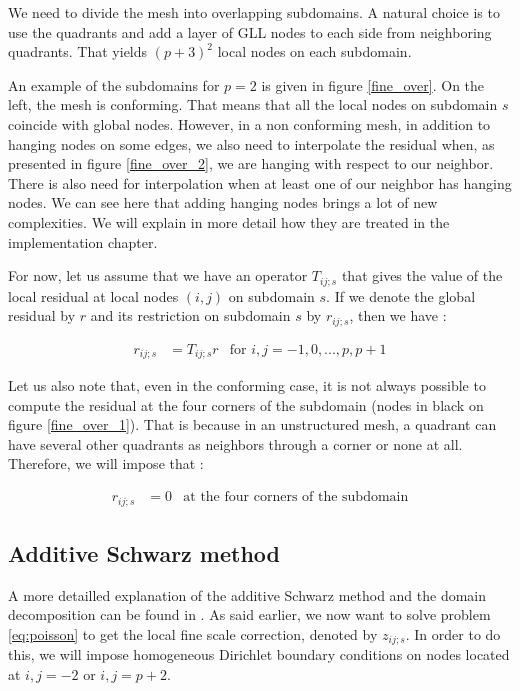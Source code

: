 We need to divide the mesh into overlapping subdomains. A natural choice is to use the quadrants and add a layer of GLL nodes to each side from neighboring quadrants. That yields $(p+3)^2$ local nodes on each subdomain. 

An example of the subdomains for $p=2$ is given in figure \ref{fine_over}. On the left, the mesh is conforming. That means that all the local nodes on subdomain $s$ coincide with global nodes. However, in a non conforming mesh, in addition to hanging nodes on some edges, we also need to interpolate the residual when, as presented in figure \ref{fine_over_2}, we are hanging with respect to our neighbor. There is also need for interpolation when at least one of our neighbor has hanging nodes. We can see here that adding hanging nodes brings a lot of new complexities. We will explain in more detail how they are treated in the implementation chapter. 

For now, let us assume that we have an operator $T_{ij;s}$ that gives the value of the local residual at local nodes $(i,j)$ on subdomain $s$. If we denote the global residual by $r$ and its restriction on subdomain $s$ by $r_{ij;s}$, then we have : 

\begin{align*}
r_{ij;s} &= T_{ij;s}r &\text{for $i,j=-1,0,...,p,p+1$} 
\end{align*}

Let us also note that, even in the conforming case, it is not always possible to compute the residual at the four corners of the subdomain (nodes in black on figure \ref{fine_over_1}). That is because in an unstructured mesh, a quadrant can have several other quadrants as neighbors through a corner or none at all. Therefore, we will impose that :

\begin{align*}
r_{ij;s} &= 0  &\text{at the four corners of the subdomain}
\end{align*} 

\subsection{Additive Schwarz method}

A more detailled explanation of the additive Schwarz method and the domain decomposition can be found in \cite{fine_book}. As said earlier, we now want to solve problem \ref{eq:poisson} to get the local fine scale correction, denoted by $z_{ij;s}$. In order to do this, we will impose homogeneous Dirichlet boundary conditions on nodes located at $i,j = -2$ or $i,j= p+2$.

